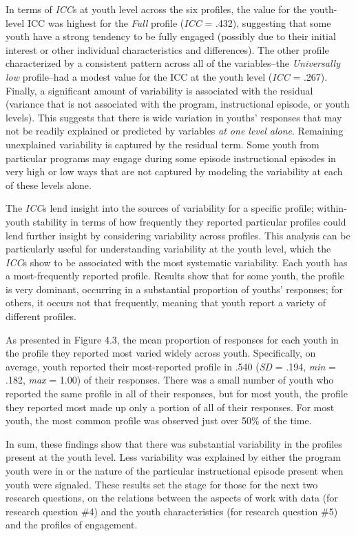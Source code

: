 \documentclass[]{msu-thesis}
\theoremstyle{definition}
\theoremstyle{definition}
\theoremstyle{definition}
\theoremstyle{remark}
\begin{document}
In terms of \emph{ICC}s at youth level across the six profiles, the
value for the youth-level ICC was highest for the \emph{Full} profile
(\emph{ICC} = .432), suggesting that some youth have a strong tendency
to be fully engaged (possibly due to their initial interest or other
individual characteristics and differences). The other profile
characterized by a consistent pattern across all of the variables--the
\emph{Universally low} profile--had a modest value for the ICC at the
youth level (\emph{ICC} = .267). Finally, a significant amount of
variability is associated with the residual (variance that is not
associated with the program, instructional episode, or youth levels).
This suggests that there is wide variation in youths' responses that may
not be readily explained or predicted by variables \emph{at one level
alone}. Remaining unexplained variability is captured by the residual
term. Some youth from particular programs may engage during some episode
instructional episodes in very high or low ways that are not captured by
modeling the variability at each of these levels alone.

The \emph{ICC}s lend insight into the sources of variability for a
specific profile; within-youth stability in terms of how frequently they
reported particular profiles could lend further insight by considering
variability across profiles. This analysis can be particularly useful
for understanding variability at the youth level, which the \emph{ICC}s
show to be associated with the most systematic variability. Each youth
has a most-frequently reported profile. Results show that for some
youth, the profile is very dominant, occurring in a substantial
proportion of youths' responses; for others, it occurs not that
frequently, meaning that youth report a variety of different profiles.

As presented in Figure 4.3, the mean proportion of responses for each
youth in the profile they reported most varied widely across youth.
Specifically, on average, youth reported their most-reported profile in
.540 (\emph{SD} = .194, \emph{min} = .182, \emph{max} = 1.00) of their
responses. There was a small number of youth who reported the same
profile in all of their responses, but for most youth, the profile they
reported most made up only a portion of all of their responses. For most
youth, the most common profile was observed just over 50\% of the time.

In sum, these findings show that there was substantial variability in
the profiles present at the youth level. Less variability was explained
by either the program youth were in or the nature of the particular
instructional episode present when youth were signaled. These results
set the stage for those for the next two research questions, on the
relations between the aspects of work with data (for research question
\#4) and the youth characteristics (for research question \#5) and the
profiles of engagement.
\end{document}
